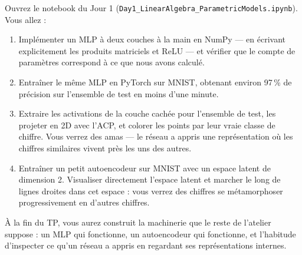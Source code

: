 Ouvrez le notebook du Jour 1 (\texttt{Day1\_LinearAlgebra\_ParametricModels.ipynb}). Vous allez :

\begin{enumerate}
  \item Implémenter un MLP à deux couches à la main en NumPy --- en écrivant explicitement les produits matriciels et ReLU --- et vérifier que le compte de paramètres correspond à ce que nous avons calculé.
  \item Entraîner le même MLP en PyTorch sur MNIST, obtenant environ 97\,\% de précision sur l'ensemble de test en moins d'une minute.
  \item Extraire les activations de la couche cachée pour l'ensemble de test, les projeter en 2D avec l'ACP, et colorer les points par leur vraie classe de chiffre. Vous verrez des amas --- le réseau a appris une représentation où les chiffres similaires vivent près les uns des autres.
  \item Entraîner un petit autoencodeur sur MNIST avec un espace latent de dimension 2. Visualiser directement l'espace latent et marcher le long de lignes droites dans cet espace : vous verrez des chiffres se métamorphoser progressivement en d'autres chiffres.
\end{enumerate}

À la fin du TP, vous aurez construit la machinerie que le reste de l'atelier suppose : un MLP qui fonctionne, un autoencodeur qui fonctionne, et l'habitude d'inspecter ce qu'un réseau a appris en regardant ses représentations internes.
